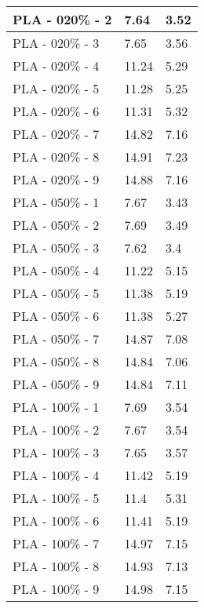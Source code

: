 \begin{longtable}{ | X | X | X | }
	PLA - 020\% - 2 & 7.64 & 3.52 \\ \hline
	PLA - 020\% - 3 & 7.65 & 3.56 \\ \hline
	PLA - 020\% - 4 & 11.24 & 5.29 \\ \hline
	PLA - 020\% - 5 & 11.28 & 5.25 \\ \hline
	PLA - 020\% - 6 & 11.31 & 5.32 \\ \hline
	PLA - 020\% - 7 & 14.82 & 7.16 \\ \hline
	PLA - 020\% - 8 & 14.91 & 7.23 \\ \hline
	PLA - 020\% - 9 & 14.88 & 7.16 \\ \hline
	PLA - 050\% - 1 & 7.67 & 3.43 \\ \hline
	PLA - 050\% - 2 & 7.69 & 3.49 \\ \hline
	PLA - 050\% - 3 & 7.62 & 3.4 \\ \hline
	PLA - 050\% - 4 & 11.22 & 5.15 \\ \hline
	PLA - 050\% - 5 & 11.38 & 5.19 \\ \hline
	PLA - 050\% - 6 & 11.38 & 5.27 \\ \hline
	PLA - 050\% - 7 & 14.87 & 7.08 \\ \hline
	PLA - 050\% - 8 & 14.84 & 7.06 \\ \hline
	PLA - 050\% - 9 & 14.84 & 7.11 \\ \hline
	PLA - 100\% - 1 & 7.69 & 3.54 \\ \hline
	PLA - 100\% - 2 & 7.67 & 3.54 \\ \hline
	PLA - 100\% - 3 & 7.65 & 3.57 \\ \hline
	PLA - 100\% - 4 & 11.42 & 5.19 \\ \hline
	PLA - 100\% - 5 & 11.4 & 5.31 \\ \hline
	PLA - 100\% - 6 & 11.41 & 5.19 \\ \hline
	PLA - 100\% - 7 & 14.97 & 7.15 \\ \hline
	PLA - 100\% - 8 & 14.93 & 7.13 \\ \hline
	PLA - 100\% - 9 & 14.98 & 7.15 \\ \hline
\end{longtable}